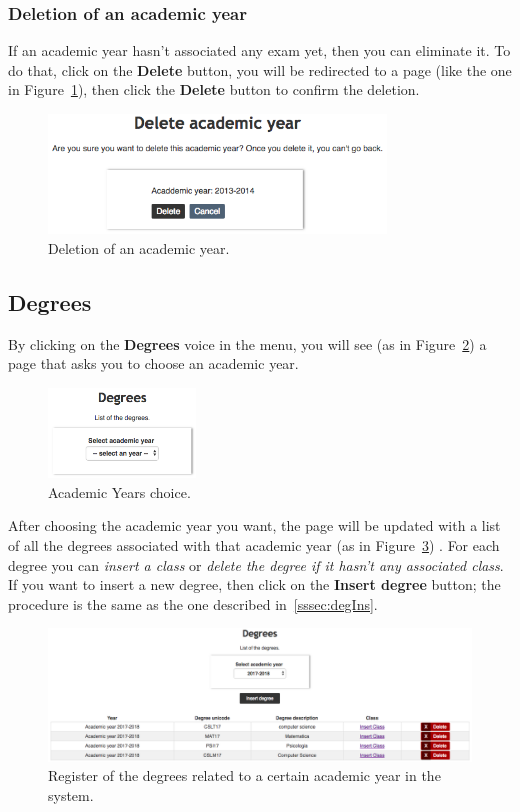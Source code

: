 \subsubsection{Deletion of an academic year}
If an academic year hasn't associated any exam yet, then you can eliminate it. To do that, click on the \textbf{Delete} button, you will be redirected to a page (like the one in Figure~\ref{fig:deleteAcademicYear}), then click the \textbf{Delete} button to confirm the deletion.
\begin{figure}[H]
  \centering
  \includegraphics[width=0.80\textwidth]{img/deleteAcademicYear.png}
  \caption{Deletion of an academic year.}
  \label{fig:deleteAcademicYear}
\end{figure}

\subsection{Degrees}
By clicking on the \textbf{Degrees} voice in the menu, you will see (as in Figure~\ref{fig:chooseYear}) a page that asks you to choose an academic year. 
\begin{figure}[H]
	\centering
	\includegraphics[width=0.35\textwidth]{img/chooseYear.png}
	\caption{Academic Years choice.}
	\label{fig:chooseYear}
\end{figure}

After choosing the academic year you want, the page will be updated with a list of all the degrees associated with that academic year (as in Figure~\ref{fig:degreeCourses}) . For each degree you can \emph{insert a class}  or \emph{delete the degree if it hasn't any associated class}. If you want to insert a new degree, then click on the \textbf{Insert degree} button; the procedure is the same as the one described in~\ref{sssec:degIns}.
\begin{figure}[!h]
  \centering
  \includegraphics[width=1.0\textwidth]{img/degreeCourses.png}
  \caption{Register of the degrees related to a certain academic year in the system.}
  \label{fig:degreeCourses}
\end{figure}

